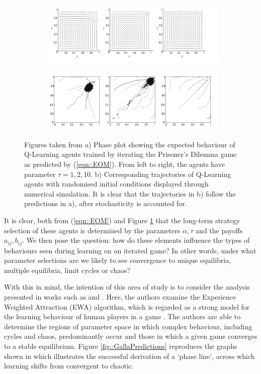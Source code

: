 \documentclass[.../main.tex]{subfiles}
\begin{document}
	\begin{figure}[h]
		\centering
		\begin{subfigure}[b]{0.9 \textwidth}
			\centering
			\includegraphics[width=0.75 \textwidth]{Figures/Dynamics}
			\caption{}
		\end{subfigure}
		
		\begin{subfigure}[b]{0.9 \textwidth}
			\centering
			\includegraphics[width=0.7 \textwidth]{Figures/Q-Learners}
			\caption{}
		\end{subfigure}

		\caption{ \label{fig::TuylsExperiments} Figures taken from \cite{Tuyls2006AnGames} a) Phase
		plot showing the expected behaviour of Q-Learning agents trained by iterating the
		Prisoner's Dilemma game as predicted by (\ref{eqn::EOM}). From left to right, the agents
		have parameter $\tau = 1, 2, 10$. b) Corresponding trajectories of Q-Learning agents with
		randomised initial conditions displayed through numerical simulation. It is clear that the
		trajectories in b) follow the predictions in a), after stochasticity is accounted for. }
	\end{figure}	

	It is clear, both from (\ref{eqn::EOM}) and Figure \ref{fig::TuylsExperiments} that the long-term strategy selection of
	these agents is determined by the parameters $\alpha, \tau$ and the payoffs $a_{ij}, b_{ij}$. We
	then pose the question: how do these elements influence the types of behaviours seen during
	learning on an iterated game? In other words, under what parameter selections are we likely to
	see convergence to unique equilibria, multiple equilibria, limit cycles or chaos?

	With this in mind, the intention of this area of study is to consider the analysis presented in
	works such as \cite{Sanders2018} and \cite{Galla2011}. Here, the authors examine the
	Experience Weighted Attraction (EWA) algorithm, which is regarded as a strong model for the
	learning behaviour of human players in a game \cite{Camerer2009}. The authors are able to
	determine the regions of parameter space in which complex behaviour,
	including cycles and chaos, predominantly occur and those in which a given game converges to a
	stable equilibrium. Figure \ref{fig::GallaPredictions} reproduces the graphs shown in \cite{Sanders2018} which
	illustrates the successful derivation of a `phase line', across which learning shifts from
	convergent to chaotic.
\end{document}
